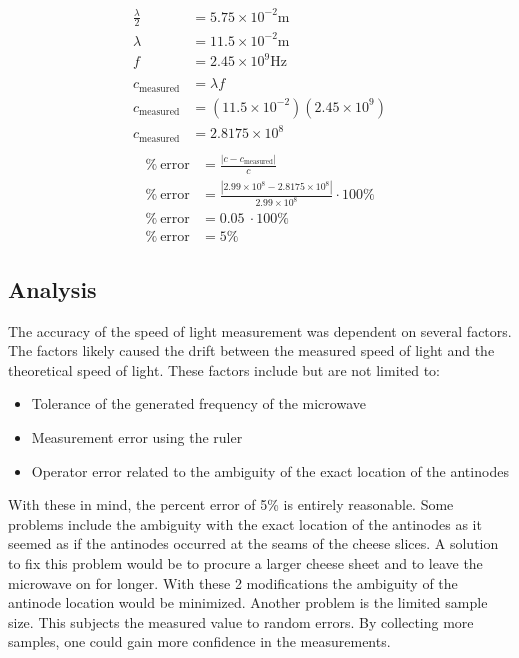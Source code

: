 \documentclass[conference]{IEEEtran}
\begin{document}
\begin{align*}
\frac{\lambda }{2} & =5.75\times 10^{-2}\text{m}\\
\lambda  & =11.5\times 10^{-2}\text{m}\\
f & =2.45\times 10^{9}\text{Hz}\\
 & \\
c_{\text{measured}} & =\lambda f\\
c_{\text{measured}} & =\left( 11.5\times 10^{-2}\right)\left( 2.45\times 10^{9}\right)\\
c_{\text{measured}} & =2.8175\times 10^{8} \\
\end{align*}
\begin{align*}
\%\ \text{error} & =\frac{|c-c_{\text{measured}}{} |}{c}\\
\%\ \text{error} & =\frac{|2.99\times 10^{8} -2.8175\times 10^{8} |}{2.99\times 10^{8}} \cdot 100\%\\
\%\ \text{error} & =0.05\ \cdot 100\%\\
\%\ \text{error} & =5\%
\end{align*}


\subsection{Analysis}

The accuracy of the speed of light measurement was dependent on several factors.
The factors likely caused the drift between the measured speed of light and the
theoretical speed of light. These factors include but are not limited to:
\begin{itemize}
    \item Tolerance of the generated frequency of the microwave 
    \item Measurement error using the ruler
    \item Operator error related to the ambiguity of the exact location of the antinodes
\end{itemize}
With these in mind, the percent error of 5\% is entirely reasonable. Some
problems include the ambiguity with the exact location of the antinodes as it
seemed as if the antinodes occurred at the seams of the cheese slices. A
solution to fix this problem would be to procure a larger cheese sheet and to
leave the microwave on for longer. With these 2 modifications the ambiguity of
the antinode location would be minimized. Another problem is the limited sample
size. This subjects the measured value to random errors. By collecting more
samples, one could gain more confidence in the measurements.
\end{document}
